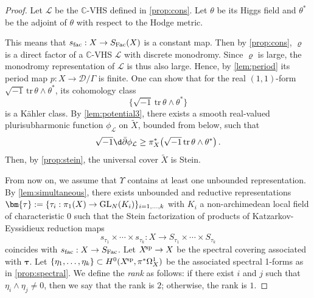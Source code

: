 \documentclass[english]{amsproc}
\theoremstyle{plain}
\theoremstyle{definition}
\theoremstyle{remark}
\theoremstyle{plain}
\numberwithin{equation}{thm} %
\newcommand{\sD}{\mathscr{D}}
\newcommand{\cL}{\mathcal L}
\newcommand{\bC}{\mathbb{C}}
\newcommand{\xsp}{X^{\! \rm sp}}
\def\db{\bar{\partial}}
\def\sn{\sqrt{-1}}
\def\btau{{\bm{\tau}}}
\newcommand{\GL}{{\rm GL}}
\begin{document}
\begin{proof}
	Let $\cL$ be the $\bC$-VHS defined in \cref{prop:cons}.  Let  $\theta$ be its Higgs field   and $\theta^*$ be  the  adjoint of $\theta$ with respect to the Hodge metric.  
	
	\medspace
	
	
	This means that $s_{\rm fac}:X\to S_{\rm Fac}(X)$ is a constant map.   Then by \cref{prop:cons},  $\varrho$ is  a direct factor of a $\bC$-VHS $\cL$ with discrete monodromy.  	Since $\varrho$ is large,  the monodromy representation of $\cL$  is thus also large.  Hence, by \cref{lem:period}  its period map $p:X\to \sD/\Gamma$ is finite.  One can show that for the real \((1,1)\)-form 
	\(\sqrt{-1}\,\mathrm{tr}\,\theta \wedge \theta^{*}\), its cohomology class
	\[
	\bigl\{\sqrt{-1}\,\mathrm{tr}\,\theta \wedge \theta^{*}\bigr\}
	\]
	is a K\"ahler class.
	By \cref{lem:potential3}, there exists a smooth  real-valued   plurisubharmonic function 
	\(\phi_\cL\) on \(\widetilde{X}\), bounded from below, such that 
\[\sn\d\db \phi_{\mathcal{L}} \ge \pi_X^{*}\!\left(\sqrt{-1}\,\mathrm{tr}\,\theta \wedge \theta^{*}\right).
	\]
	Then, by \cref{prop:stein}, the universal cover \(\widetilde{X}\) is Stein.
	
	\medspace
	
	From now on, we assume that $\Upsilon$  contains at least one  unbounded representation. By \cref{lem:simultaneous}, there exists  unbounded and  reductive representations $\btau:=\{\tau_i:\pi_1(X)\to \GL_{N}(K_i)\}_{i=1,\ldots,k}$ with $K_i$ a non-archimedean local field of characteristic $0$ such that the Stein factorization of  products of   Katzarkov-Eyssidieux reduction maps $$s_{\tau_1}\times\cdots\times s_{\tau_k}:X\to S_{\tau_1}\times\cdots\times S_{\tau_k}$$ coincides with $s_{\rm fac}:X\to S_{\rm Fac}$.     
	Let $\xsp\to X$ be the spectral covering associated with $\btau$.   Let  $\{\eta_1,\ldots,\eta_k\}\subset H^0(\xsp, \pi^*\Omega_X^1)$  be the associated spectral 1-forms as in \cref{prop:spectral}.  We define the \emph{rank} as follows:     if there exist   \( i \) and \( j \) such that \( \eta_i \wedge \eta_j \neq 0 \), then we say that the rank is \( 2 \); otherwise, the rank is \( 1 \). 
	

\end{proof}
\end{document}
